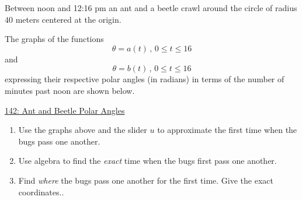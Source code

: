 \documentclass{ximera}
\begin{document}
\begin{question}  \label{Q9dfdfhdferrefe94tf4}

Between noon and 12:16 pm an ant and a beetle crawl around the circle of radius $40$ meters centered at the origin.  

The graphs of the functions
\[
  \theta = a(t) \, , \, 0\leq t \leq 16
\]
and
\[
   \theta = b(t) \, , \, 0\leq t \leq 16
\]
expressing their respective polar angles (in radians) in terms of the number of minutes past noon are shown below.

\begin{onlineOnly}
    \begin{center}
\end{center}
\end{onlineOnly}

\href{https://www.desmos.com/calculator/dilqmqqrt4}{142: Ant and Beetle Polar Angles}


\begin{enumerate}

\item Use the graphs above and the slider $u$ to approximate the first time when the bugs pass one another. 

\item Use algebra to find the \emph{exact} time when the bugs first pass one another.

\item Find \emph{where} the bugs pass one another for the first time. Give the exact coordinates..

\end{enumerate}

\end{question}
\end{document}
